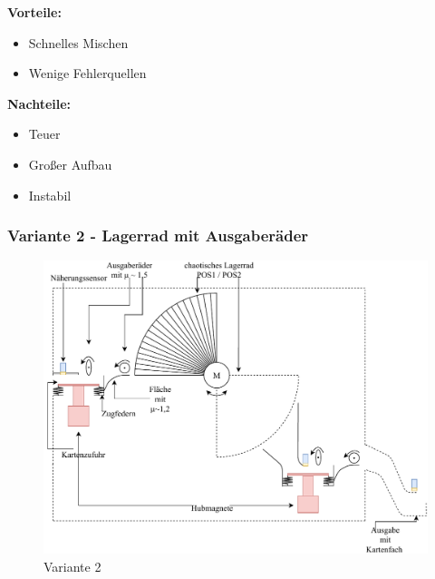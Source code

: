 \textbf{Vorteile:}
\begin{itemize}
    \item Schnelles Mischen
    \item Wenige Fehlerquellen
\end{itemize}
\textbf{Nachteile:}
\begin{itemize}
    \item Teuer
    \item Großer Aufbau %
    \item Instabil
\end{itemize}

\subsubsection{Variante 2 - Lagerrad mit Ausgaberäder}

\begin{figure}[hb]
    \centering
    \includegraphics[scale=0.9,page=1]{fig/mech/Version2}
    \caption{Variante 2}
\end{figure}

